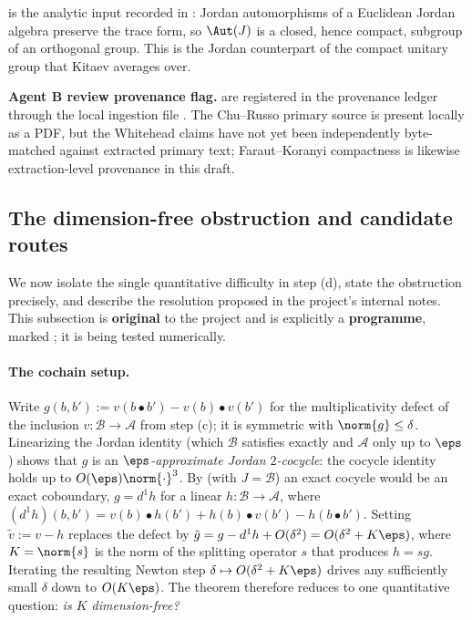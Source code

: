 \noindent {} is the analytic input recorded in
\cite{FarautKoranyi1994}: Jordan automorphisms of a Euclidean Jordan algebra
preserve the trace form, so $\Aut(J)$ is a closed, hence compact, subgroup of an
orthogonal group. This is the Jordan counterpart of the compact unitary group
that Kitaev averages over.

\smallskip\noindent\textbf{Agent B review provenance flag.}
 are registered in the provenance ledger
through the local ingestion file
.
The Chu--Russo primary source is present locally as a PDF, but the Whitehead
claims have not yet been independently byte-matched against extracted primary
text; Faraut--Koranyi compactness is likewise extraction-level provenance in
this draft.

\subsection{The dimension-free obstruction and candidate routes}

We now isolate the single quantitative difficulty in step (d), state the
obstruction precisely, and describe the resolution proposed in the project's
internal notes. This subsection is \textbf{original} to the project and is
explicitly a \textbf{programme}, marked ; it is being tested
numerically.

\paragraph{The cochain setup.}
Write $g(b,b'):=v(b\bullet b')-v(b)\bullet v(b')$ for the multiplicativity
defect of the inclusion $v\colon\mathcal{B}\to\mathcal{A}$ from step (c); it is
symmetric with $\norm{g}\le\delta$. Linearizing the Jordan identity (which
$\mathcal{B}$ satisfies exactly and $\mathcal{A}$ only up to $\eps$) shows that
$g$ is an \emph{$\eps$-approximate Jordan $2$-cocycle}: the cocycle identity holds
up to $O(\eps)\norm{\cdot}^{3}$. By  (with $J=\mathcal{B}$)
an exact cocycle would be an exact coboundary, $g=d^{1}h$ for a linear
$h\colon\mathcal{B}\to\mathcal{A}$, where
$(d^{1}h)(b,b')=v(b)\bullet h(b')+h(b)\bullet v(b')-h(b\bullet b')$. Setting
$\tilde v:=v-h$ replaces the defect by
$\tilde g=g-d^{1}h+O(\delta^{2})=O(\delta^{2}+K\eps)$, where $K=\norm{s}$ is the
norm of the splitting operator $s$ that produces $h=sg$. Iterating the resulting
Newton step $\delta\mapsto O(\delta^{2}+K\eps)$ drives any sufficiently small
$\delta$ down to $O(K\eps)$. The theorem therefore reduces to one quantitative
question: \emph{is $K$ dimension-free?}

